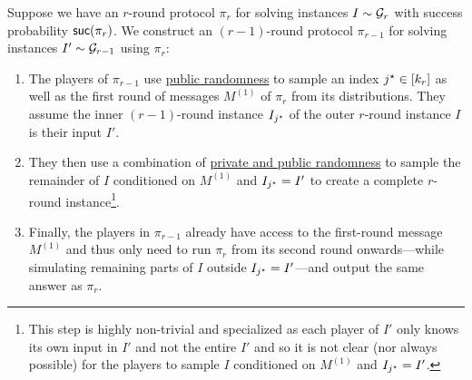 \documentclass[11pt]{article}
\theoremstyle{definition}
\newenvironment{tbox}{\begin{tcolorbox}[
		enlarge top by=5pt,
		enlarge bottom by=5pt,
		 breakable,
		 boxsep=0pt,
                  left=4pt,
                  right=4pt,
                  top=10pt,
                  arc=4pt,
                  boxrule=1pt,toprule=1pt,
                  colback=white
                  ]%
	}
{\end{tcolorbox}}
\newcommand{\prot}{\ensuremath{\pi}}
\newcommand{\suc}{\ensuremath{\textnormal{\textsf{suc}}}}
\begin{document}
Suppose we have an $r$-round protocol $\prot_r$ for solving instances $I \sim \mathcal{G}_r$ with success probability $\suc({\prot_r})$. We construct an $(r-1)$-round protocol $\prot_{r-1}$ 
for solving instances $I' \sim \mathcal{G}_{r-1}$ using $\prot_r$: 
\begin{tbox}
	\begin{enumerate}
		\item The players of $\prot_{r-1}$ use \underline{public randomness} to sample an index $j^{\star} \in [k_r]$ as well as the first round of messages $M^{(1)}$ of $\prot_r$ from its distributions. They assume the inner 
		$(r-1)$-round instance $I_{j^{\star}}$ of the outer $r$-round instance $I$ is their input $I'$. 
		\item They then use a combination of \underline{private and public randomness} to sample the remainder of $I$ conditioned on $M^{(1)}$ and $I_{j^{\star}} = I'$ to create a complete $r$-round instance\footnote{This step
			is highly non-trivial and specialized as each player of $I'$ only knows its own input in $I'$ and not the entire $I'$ and so it is not clear (nor always possible) for the players to sample $I$ conditioned on $M^{(1)}$ and $I_{j^{\star}}=I'$.}. 
		\item Finally, the players in $\prot_{r-1}$ already have access to the first-round message $M^{(1)}$ and thus only need to run $\prot_r$ from its second round onwards---while simulating remaining parts of $I$ outside $I_{j^{\star}}=I'$---and
		output the same answer as $\prot_r$. 
	\end{enumerate}
\end{tbox}
\end{document}
